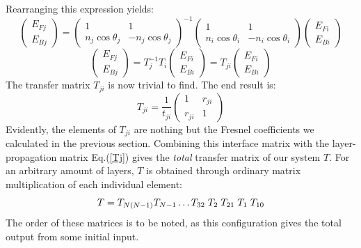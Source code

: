\documentclass[preprint, onecolumn, amsmath, amssymb, aps]{revtex4-1}
\numberwithin{equation}{section}
\begin{document}
\noindent
Rearranging this expression yields:
\begin{equation}
\begin{pmatrix}
		E_{Fj}  \\
		E_{Bj}
\end{pmatrix} =
\begin{pmatrix}
		1 & 1 \\
		n_{j} \cos \theta_{j} & - n_{j} \cos \theta_{j}
\end{pmatrix}^{-1}
\begin{pmatrix}
	1 & 1 \\
	n_{i} \cos \theta_{i} & - n_{i} \cos \theta_{i}
\end{pmatrix}  
\begin{pmatrix}
		E_{Fi}  \\
		E_{Bi}
\end{pmatrix} \nonumber
\end{equation}
\begin{equation}
\begin{pmatrix}
		E_{Fj}  \\
		E_{Bj}
\end{pmatrix} =
	 T_{j}^{-1} T_{i}
\begin{pmatrix}
		E_{Fi}  \\
		E_{Bi}
\end{pmatrix} = 
    T_{ji}
\begin{pmatrix}
	E_{Fi}  \\
	E_{Bi}
\end{pmatrix}
\end{equation}
\noindent
The transfer matrix $T_{ji}$ is now trivial to find. The end result is:
\begin{equation}\label{Tji}
T_{ji} = \frac{1}{t_{ji}}
\begin{pmatrix}
		1 & r_{ji} \\
		r_{ji} & 1
\end{pmatrix}
\end{equation}
\noindent
Evidently, the elements of $T_{ji}$ are nothing but the Fresnel coefficients we calculated in the previous section. Combining this interface matrix with the layer-propagation matrix Eq.(\ref{Tj}) gives the \textit{total} transfer matrix of our system $T$. For an arbitrary amount of layers, $T$ is obtained through ordinary matrix multiplication of each individual element:
\begin{equation}
T = T_{N(N-1)} T_{N-1} \hdots T_{32} \hspace{1mm} T_{2} \hspace{1mm} T_{21} \hspace{1mm} T_{1} \hspace{1mm} T_{10}
\end{equation}
\noindent
The order of these matrices is to be noted, as this configuration gives the total output from some initial input. 
\end{document}
